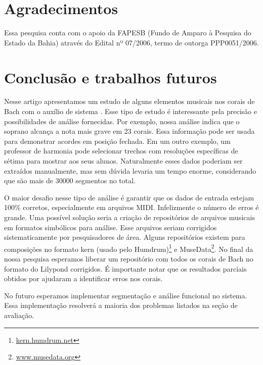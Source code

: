 \section{Agradecimentos}
\label{sec:agradecimentos}

Essa pesquisa conta com o apoio da FAPESB (Fundo de Amparo à Pesquisa
do Estado da Bahia) através do Edital nº 07/2006, termo de outorga
PPP0051/2006.

\section{Conclusão e trabalhos futuros}
\label{sec:concl-e-trab}

Nesse artigo apresentamos um estudo de alguns elementos musicais nos
corais de Bach com o auxílio de sistema \rameau{}. Esse tipo de estudo
é interessante pela precisão e possibilidades de análise fornecidas.
Por exemplo, nossa análise indica que o soprano alcança a nota mais
grave em 23 corais. Essa informação pode ser usada para demonstrar
acordes em posição fechada. Em um outro exemplo, um professor de
harmonia pode selecionar trechos com resoluções específicas de sétima
para mostrar aos seus alunos. Naturalmente esses dados poderiam ser
extraídos manualmente, mas sem dúvida levaria um tempo enorme,
considerando que são mais de 30000 segmentos no total.

O maior desafio nesse tipo de análise é garantir que os dados de
entrada estejam 100\% corretos, especialmente em arquivos MIDI.
Infelizmente o número de erros é grande. Uma possível solução seria a
criação de repositórios de arquivos musicais em formatos simbólicos
para análise. Esse arquivos seriam corrigidos sistematicamente por
pesquisadores de área. Alguns repositórios existem para composições no
formato kern (usado pelo Humdrum)\footnote{\url{kern.humdrum.net}} e
MuseData\footnote{\url{www.musedata.org}}. No final da nossa pesquisa
esperamos liberar um repositório com todos os corais de Bach no
formato do Lilypond corrigidos. É importante notar que os resultados
parciais obtidos por \rameau{} ajudaram a identificar erros nos
corais.

No futuro esperamos implementar segmentação e análise funcional no
sistema. Essa implementação resolverá a maioria dos problemas listados
na seção de avaliação.

